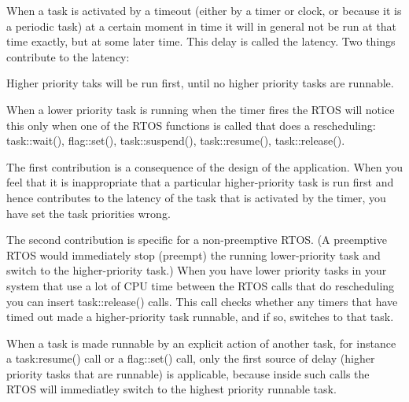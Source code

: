 When a task is activated by a timeout (either by a timer or clock, or because it is a periodic task) at a certain moment in time it will in general not be run at that time exactly, but at some later time. This delay is called the latency. Two things contribute to the latency\+:


\begin{DoxyEnumerate}
\item Higher priority taks will be run first, until no higher priority tasks are runnable.
\item When a lower priority task is running when the timer fires the R\+T\+OS will notice this only when one of the R\+T\+OS functions is called that does a rescheduling\+: task\+::wait(), flag\+::set(), task\+::suspend(), task\+::resume(), task\+::release().
\end{DoxyEnumerate}

The first contribution is a consequence of the design of the application. When you feel that it is inappropriate that a particular higher-\/priority task is run first and hence contributes to the latency of the task that is activated by the timer, you have set the task priorities wrong.

The second contribution is specific for a non-\/preemptive R\+T\+OS. (A preemptive R\+T\+OS would immediately stop (preempt) the running lower-\/priority task and switch to the higher-\/priority task.) When you have lower priority tasks in your system that use a lot of C\+PU time between the R\+T\+OS calls that do rescheduling you can insert task\+::release() calls. This call checks whether any timers that have timed out made a higher-\/priority task runnable, and if so, switches to that task.

When a task is made runnable by an explicit action of another task, for instance a task\+:resume() call or a flag\+::set() call, only the first source of delay (higher priority tasks that are runnable) is applicable, because inside such calls the R\+T\+OS will immediatley switch to the highest priority runnable task. 